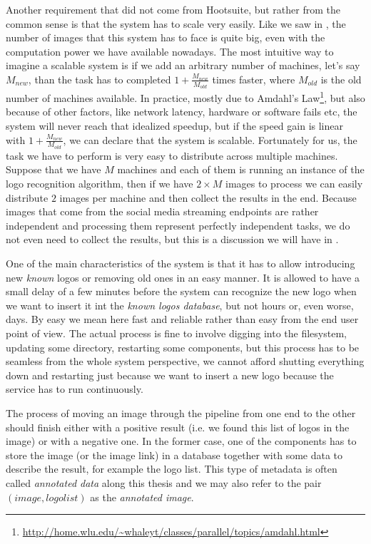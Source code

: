 Another requirement that did not come from Hootsuite, but rather from the
common sense is that the system has to scale very easily. Like we saw in
, the number of images that this
system has to face is quite big, even with the computation power we have
available nowadays. The most intuitive way to imagine a scalable system is if
we add an arbitrary number of machines, let's say \(M_{new}\), than the task has to
completed \(1 + \frac{M_{new}}{M_{old}}\) times faster, where \(M_{old}\) is the old number
of machines available. In practice, mostly due to Amdahl's
Law\footnote{\url{http://home.wlu.edu/~whaleyt/classes/parallel/topics/amdahl.html}},
but also because of other factors, like network latency, hardware or software
fails etc, the system will never reach that idealized speedup, but if the
speed gain is linear with \(1 + \frac{M_{new}}{M_{old}}\), we can declare that the
system is scalable. Fortunately for us, the task we have to perform is very
easy to distribute across multiple machines. Suppose that we have \(M\)
machines and each of them is running an instance of the logo recognition
algorithm, then if we have \(2 \times M\) images to process we can easily
distribute \(2\) images per machine and then collect the results in the end.
Because images that come from the social media streaming endpoints are rather
independent and processing them represent perfectly independent tasks, we do
not even need to collect the results, but this is a discussion we will have in
.

One of the main characteristics of the system is that it has to allow
introducing new \textit{known} logos or removing old ones in an easy manner.
It is allowed to have a small delay of a few minutes before the system can
recognize the new logo when we want to insert it
int the \textit{known logos database}, but not hours or, even worse,
days. By easy we mean here fast and reliable rather than easy from the end user point of
view. The actual process is fine to involve digging into the filesystem,
updating some directory, restarting some components, but this process has to
be seamless from the whole system perspective, we cannot afford shutting
everything down and restarting just because we want to insert a new logo
because the service has to run continuously.

The process of moving an image through the pipeline from one end to the other
should finish either with a positive result (i.e. we found this list of logos
in the image) or with a negative one. In the former case, one of the
components has to store the image (or the image link) in a database together
with some data to describe the result, for example the logo list. This type of
metadata is often called \textit{annotated data} along this thesis and we may
also refer to the pair \((image, logo list)\) as the \textit{annotated
image}.

